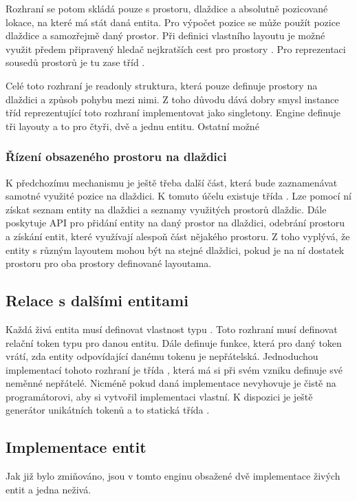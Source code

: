 Rozhraní  se potom skládá pouze s prostoru, dlaždice a absolutně pozicované lokace, na které má stát daná entita.
Pro výpočet pozice se může použít pozice dlaždice a samozřejmě daný prostor. Při definici vlastního layoutu  je možné využit 
předem připravený hledač nejkratších cest pro prostory . Pro reprezentaci sousedů prostorů je tu 
zase tříd .

Celé toto rozhraní je readonly struktura, která pouze definuje prostory na dlaždici a způsob pohybu mezi nimi. Z toho důvodu
dává dobry smysl instance tříd reprezentující toto rozhraní implementovat jako singletony. Engine definuje tři layouty a to 
pro čtyři, dvě a jednu entitu. Ostatní možné 


\subsubsection{Řízení obsazeného prostoru na dlaždici}
K předchozímu mechanismu je ještě třeba další část, která bude zaznamenávat samotné využité pozice na dlaždici. K tomuto 
účelu existuje třída .  Lze pomocí ní získat seznam entity na dlaždici a seznamy využitých prostorů dlaždic.
Dále poskytuje API pro přidání entity na daný prostor na dlaždici, odebrání prostoru a získání entit, které využívají 
alespoň část nějakého prostoru. Z toho vyplývá, že entity s různým layoutem mohou být na stejné dlaždici, pokud
je na ní dostatek prostoru pro oba prostory definované layoutama.

\subsection{Relace s dalšími entitami}
Každá živá entita musí definovat vlastnost typu . Toto rozhraní musí definovat relační token typu
 pro danou entitu. Dále definuje funkce, která pro daný token vrátí, zda entity odpovídající danému 
tokenu je nepřátelská. Jednoduchou implementací tohoto rozhraní je třída , která má
si při svém vzniku definuje své neměnné nepřátelé. Nicméně pokud daná implementace nevyhovuje je čistě na programátorovi,
aby si vytvořil implementaci vlastní. K dispozici je ještě generátor unikátních tokenů a to statická třída .

\subsection{Implementace entit}
Jak již bylo zmiňováno, jsou v tomto enginu obsažené dvě implementace živých entit a jedna neživá.

